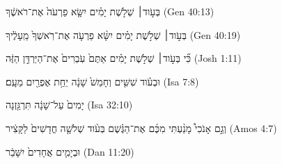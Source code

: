 
\begin{exe}

\ex\label{disfut_exs1}
\texthebrew{
בְּעֹ֣וד׀ שְׁלֹ֣שֶׁת יָמִ֗ים יִשָּׂ֤א פַרְעֹה֙ אֶת־רֹאשֶׁ֔ךָ 
} (Gen 40:13)

\ex\label{disfut_exs2}
\texthebrew{
בְּעֹ֣וד׀ שְׁלֹ֣שֶׁת יָמִ֗ים יִשָּׂ֨א פַרְעֹ֤ה אֶת־רֹֽאשְׁךָ֙ מֵֽעָלֶ֔יךָ 
} (Gen 40:19)

\ex\label{disfut_exs3}
\texthebrew{
כִּ֞י בְּעֹ֣וד׀ שְׁלֹ֣שֶׁת יָמִ֗ים אַתֶּם֙ עֹֽבְרִים֙ אֶת־הַיַּרְדֵּ֣ן הַזֶּ֔ה 
} (Josh 1:11)

\ex\label{disfut_exs4}
\texthebrew{
וּבְעֹ֗וד שִׁשִּׁ֤ים וְחָמֵשׁ֙ שָׁנָ֔ה יֵחַ֥ת אֶפְרַ֖יִם מֵעָֽם׃ 
} (Isa 7:8)

\ex\label{disfut_exs5}
\texthebrew{
יָמִים֙ עַל־שָׁנָ֔ה תִּרְגַּ֖זְנָה 
} (Isa 32:10)

\ex\label{disfut_exs6}
\texthebrew{
וְגַ֣ם אָנֹכִי֩ מָנַ֨עְתִּי מִכֶּ֜ם אֶת־הַגֶּ֗שֶׁם בְּעֹ֨וד שְׁלֹשָׁ֤ה חֳדָשִׁים֙ לַקָּצִ֔יר 
} (Amos 4:7)

\ex\label{disfut_exs7}
\texthebrew{
וּבְיָמִ֤ים אֲחָדִים֙ יִשָּׁבֵ֔ר 
} (Dan 11:20)

\end{exe}
